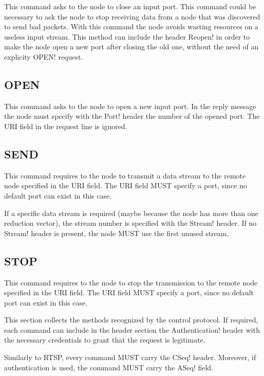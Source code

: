 This command asks to the node to close an input port.  This command
could be necessary to ask the node to stop receiving data from a node
that was discovered to send bad packets.  With this command the node
avoids wasting resources on a useless input stream.  This method can
include the header \ttt Reopen! in order to make the node open a new
port after closing the old one, without the need of an explicity \ttt
OPEN! request.

\subsection{OPEN}
\label{subsub:7.0.3;transport_layer}

This command asks to the node to open a new input port.  In the reply
message the node must specify with the \ttt Port! header the number of
the opened port.  The URI field in the request line is ignored.

\subsection{SEND}
\label{subsub:7.0.0;transport_layer}

This command requires to the node to transmit a data stream to the
remote node specified in the URI field.  The URI field MUST specify a
port, since no default port can exist in this case.

If a specific data stream is required (maybe because the node has more
than one reduction vector), the stream number is specified with the
\ttt Stream! header.  If no \ttt Stream! header is present, the node
MUST use the first unused stream.

\subsection{STOP}
\label{subsub:7.0.1;transport_layer}

This command requires to the node to stop the transmission to the
remote node specified in the URI field.  The URI field MUST specify a
port, since no default port can exist in this case.

This section collects the methods recognized by the control protocol.
If required, each command can include in the header section the \ttt
Authentication! header with the necessary credentials to grant that
the request is legitimate.

Similarly to RTSP, every command MUST carry the \ttt CSeq! header.
Moreover, if authentication is used, the command MUST carry the \ttt
ASeq! field. 

